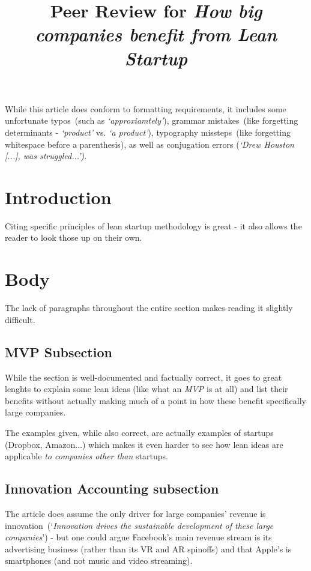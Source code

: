 \documentclass[conference]{IEEEtran}
\title{Peer Review for \textit{How big companies benefit from Lean Startup}}
\begin{document}
    \author{}

    \maketitle

    While this article does conform to formatting requirements, it includes some unfortunate
    typos~(such as \textit{`approxiamtely'}), grammar mistakes~(like forgetting determinants -
    \textit{`product'} vs. \textit{`a product'}), typography missteps~(like forgetting
    whitespace before a parenthesis), as well as conjugation errors (\textit{`Drew Houston [...],
    was struggled...')}.


    \section{Introduction}

    Citing specific principles of lean startup methodology is great - it also
    allows the reader to look those up on their own.


    \section{Body}
    The lack of paragraphs throughout the entire section makes reading it
    slightly difficult.

    \subsection{MVP Subsection}


    While the section is well-documented and factually correct, it goes to great lenghts to explain
    some lean ideas (like what an \emph{MVP} is at all) and list their benefits
    without actually making much of a point in how these benefit specifically large
    companies.

    The examples given, while also correct, are actually examples of startups
    (Dropbox, Amazon...) which makes it even harder to see how lean
    ideas are applicable \emph{to companies other than} startups.

    \subsection{Innovation Accounting subsection}

    The article does assume the only driver for large companies' revenue is
    innovation~(`\textit{Innovation drives the sustainable development of these large companies}')
    - but one could argue Facebook's main revenue stream is its advertising business
    (rather than its VR and AR spinoffs) and that Apple's is smartphones (and not music and video
    streaming).
\end{document}
